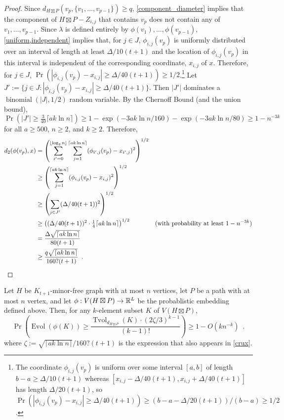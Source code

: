 \documentclass{patmorin}
\DeclareMathOperator{\evol}{Evol}
\DeclareMathOperator{\tvol}{Tvol}
\begin{document}
\begin{proof}
  Since $d_{H\boxtimes P}(v_p,\{v_1,\ldots,v_{p-1}\})\ge q$, \cref{component_diameter} implies that the component of $H\boxtimes P-Z_{i,j}$ that contains $v_p$ does not contain any of $v_1,\ldots,v_{p-1}$. Since $\lambda$ is defined entirely by $\phi(v_1),\ldots,\phi(v_{p-1})$,   \cref{uniform,independent} implies that, for $j\in J$, $\phi_{i,j}(v_p)$ is uniformly distributed over an interval of length at least $\Delta/10(t+1)$ and the location of $\phi_{i,j}(v_p)$ in this interval is independent of the corresponding coordinate, $x_{i,j}$ of $x$.
  Therefore, for $j\in J$, $\Pr(|\phi_{i,j}(v_p)-x_{i,j}|\ge \Delta/40(t+1))\ge 1/2$.\footnote{The coordinate $\phi_{i,j}(v_p)$ is uniform over some interval $[a,b]$ of length $b-a\ge \Delta/10(t+1)$ whereas $[x_{i,j}-\Delta/40(t+1),x_{i,j}+\Delta/40(t+1)]$ has length $\Delta/20(t+1)$, so $\Pr(|\phi_{i,j}(v_p)-x_{i,j}|\ge \Delta/40(t+1))\ge (b-a-\Delta/20(t+1))/(b-a)\ge 1/2$.}
  Let $J':=\{j\in J:  |\phi_{i,j}(v_p)-x_{i,j}|\ge \Delta/40(t+1)\}$.  Then $|J'|$ dominates a $\operatorname{binomial}(|J|,1/2)$ random variable.  By the Chernoff Bound (and the union bound), $\Pr(|J'|\ge \tfrac{3}{40}\lceil a k\ln n\rceil)\ge 1-\exp(-3ak\ln n/160)-\exp(-3ak\ln n/80)\ge 1-n^{-3k}$ for all $a\ge 500$, $n\ge 2$, and $k\ge 2$. Therefore,
  \begin{align*}
    d_2(\phi(v_p),x)
    & = \left(\sum_{i'=0}^{\lfloor\log_2 n\rfloor}\sum_{j=1}^{\lceil ak\ln  n\rceil}(\phi_{i',j}(v_p)-x_{i',j})^2\right)^{1/2} \\
    & \ge \left(\sum_{j=1}^{\lceil ak\ln  n\rceil}(\phi_{i,j}(v_p)-x_{i,j})^2\right)^{1/2} \\
    & \ge \left(\sum_{j\in J'}(\Delta/40(t+1))^2\right)^{1/2} \\
    & \ge \left((\Delta/40(t+1))^2\cdot \tfrac{1}{4}\lceil ak\ln  n\rceil\right)^{1/2}
      & \text{(with probability at least $1-n^{-3k}$)} \\
    & = \frac{\Delta\sqrt{\lceil ak\ln  n\rceil}}{80(t+1)} \\
    & \ge \frac{q\sqrt{\lceil ak\ln n\rceil}}{160?(t+1)} \enspace . &
    \qedhere
  \end{align*}
\end{proof}

\begin{lem}
  Let $H$ be $K_{t+1}$-minor-free graph with at most $n$ vertices, let $P$ be a path with at most $n$ vertex, and let $\phi:V(H\boxtimes P)\to\mathbb{R}^L$ be the probablistic embedding defined above.  Then, for any $k$-element subset $K$ of $V(H\boxtimes P)$,
  \[
    \Pr\left(\evol(\phi(K)) \ge \frac{\tvol_{d_{H\boxtimes P}}(K)\cdot(2\zeta/3)^{k-1}}{(k-1)!}\right) \ge 1- O(kn^{-k}) \enspace .
  \]
  where $\zeta:=\sqrt{\lceil ak\ln n\rceil}/160?(t+1)$ is the expression that also appears in \cref{crux}.
\end{lem}
\end{document}
